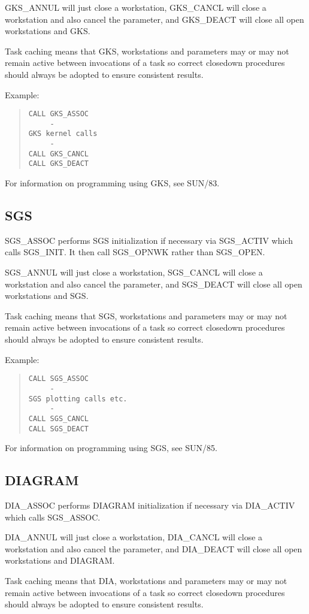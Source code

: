 GKS\_ANNUL will just close a workstation, 
GKS\_CANCL will close a workstation and also cancel the parameter,
and GKS\_DEACT will close all open workstations and GKS.

Task caching means that GKS, workstations and parameters
may or may not remain active between invocations of a task so correct
closedown procedures should always be adopted to ensure consistent results.

Example:
\begin{quote} \begin{verbatim}
CALL GKS_ASSOC
     -
GKS kernel calls
     -
CALL GKS_CANCL
CALL GKS_DEACT
\end{verbatim} \end{quote}
For information on programming using GKS, see SUN/83.

\subsection{SGS}
SGS\_ASSOC performs SGS initialization if necessary via SGS\_ACTIV which calls
SGS\_INIT. It then call SGS\_OPNWK rather than SGS\_OPEN.

SGS\_ANNUL will just close a workstation, 
SGS\_CANCL will close a workstation and also cancel the parameter,
and SGS\_DEACT will close all open workstations and SGS.

Task caching means that SGS, workstations and parameters
may or may not remain active between invocations of a task so correct
closedown procedures should always be adopted to ensure consistent results.

Example:
\begin{quote} \begin{verbatim}
CALL SGS_ASSOC
     -
SGS plotting calls etc.
     -
CALL SGS_CANCL
CALL SGS_DEACT
\end{verbatim} \end{quote}
For information on programming using SGS, see SUN/85.

\subsection{DIAGRAM}
DIA\_ASSOC performs DIAGRAM initialization if necessary via DIA\_ACTIV which 
calls SGS\_ASSOC.

DIA\_ANNUL will just close a workstation, 
DIA\_CANCL will close a workstation and also cancel the parameter,
and DIA\_DEACT will close all open workstations and DIAGRAM.

Task caching means that DIA, workstations and parameters
may or may not remain active between invocations of a task so correct
closedown procedures should always be adopted to ensure consistent results.

